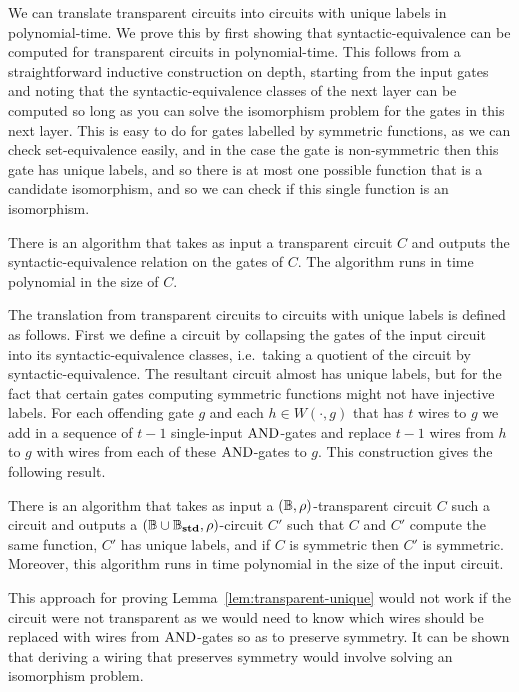 \documentclass[a4paper,UKenglish]{lipics-v2018}
\begin{document}
We can translate transparent circuits into circuits with unique labels in
polynomial-time. We prove this by first showing that syntactic-equivalence can
be computed for transparent circuits in polynomial-time. This follows from a
straightforward inductive construction on depth, starting from the input gates
and noting that the syntactic-equivalence classes of the next layer can be
computed so long as you can solve the isomorphism problem for the gates in this
next layer. This is easy to do for gates labelled by symmetric functions, as we
can check set-equivalence easily, and in the case the gate is non-symmetric then
this gate has unique labels, and so there is at most one possible function that
is a candidate isomorphism, and so we can check if this single function is an
isomorphism.

\begin{lemma}
  There is an algorithm that takes as input a transparent circuit $C$ and
  outputs the syntactic-equivalence relation on the gates of $C$. The algorithm
  runs in time polynomial in the size of $C$.
  \label{lem:transparent-syntactic-equiv}
\end{lemma}

The translation from transparent circuits to circuits with unique labels is
defined as follows. First we define a circuit by collapsing the gates of the
input circuit into its syntactic-equivalence classes, i.e.\ taking a quotient of
the circuit by syntactic-equivalence. The resultant circuit almost has unique
labels, but for the fact that certain gates computing symmetric functions might
not have injective labels. For each offending gate $g$ and each $h \in W(\cdot,
g)$ that has $t$ wires to $g$ we add in a sequence of $t-1$ single-input
$\text{\upshape AND}$-gates and replace $t-1$ wires from $h$ to $g$ with wires from each of
these $\text{\upshape AND}$-gates to $g$. This construction gives the following result.

\begin{lemma}
  There is an algorithm that takes as input a $(\mathbb{B}, \rho)$-transparent circuit
  $C$ such a circuit and outputs a $(\mathbb{B} \cup \mathbb{B}_{\text{\textbf{std}}},
  \rho)$-circuit $C'$ such that $C$ and $C'$ compute the same function, $C'$ has
  unique labels, and if $C$ is symmetric then $C'$ is symmetric. Moreover, this
  algorithm runs in time polynomial in the size of the input circuit.
  \label{lem:transparent-unique}
\end{lemma}

This approach for proving Lemma~\ref{lem:transparent-unique} would not work if
the circuit were not transparent as we would need to know which wires should be
replaced with wires from $\text{\upshape AND}$-gates so as to preserve symmetry. It can be
shown that deriving a wiring that preserves symmetry would involve solving an
isomorphism problem.
\end{document}
